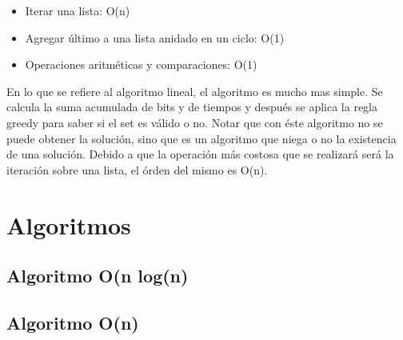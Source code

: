 \documentclass[12pt]{article}
\begin{document}
\begin{itemize}
	\item Iterar una lista: O(n)
	\item Agregar \'ultimo a una lista anidado en un ciclo: O(1)
	\item Operaciones aritm\'eticas y comparaciones: O(1)
\end{itemize}

En lo que se refiere al algoritmo lineal, el algoritmo es mucho mas simple. Se calcula la suma acumulada de bits y de tiempos y despu\'es se aplica la regla greedy para saber si el set es v\'alido o no. Notar que con \'este algoritmo no se puede obtener la soluci\'on, sino que es un algoritmo que niega o no la existencia de una soluci\'on. Debido a que la operaci\'on m\'as costosa que se realizar\'a ser\'a la iteraci\'on sobre una lista, el \'orden del mismo es O(n).

\section{Algoritmos}\label{algoritmos}
\subsection{Algoritmo O(n log(n)}


\subsection{Algoritmo O(n)}

\newpage
\end{document}

